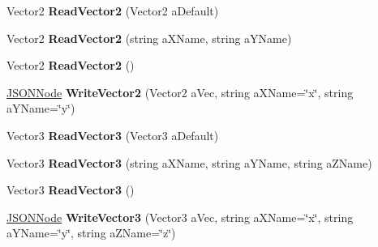 \begin{DoxyCompactItemize}
\item 
Vector2 {\bfseries Read\+Vector2} (Vector2 a\+Default)\hypertarget{classSimpleJSON_1_1JSONNode_aa04ef8dc9b65ed81326158e0f283bbd9}{}\label{classSimpleJSON_1_1JSONNode_aa04ef8dc9b65ed81326158e0f283bbd9}

\item 
Vector2 {\bfseries Read\+Vector2} (string a\+X\+Name, string a\+Y\+Name)\hypertarget{classSimpleJSON_1_1JSONNode_adf312ac8eca31e726111c4c4c8d120e0}{}\label{classSimpleJSON_1_1JSONNode_adf312ac8eca31e726111c4c4c8d120e0}

\item 
Vector2 {\bfseries Read\+Vector2} ()\hypertarget{classSimpleJSON_1_1JSONNode_a8f4a63ba7416bb8316e4da7fec586634}{}\label{classSimpleJSON_1_1JSONNode_a8f4a63ba7416bb8316e4da7fec586634}

\item 
\hyperlink{classSimpleJSON_1_1JSONNode}{J\+S\+O\+N\+Node} {\bfseries Write\+Vector2} (Vector2 a\+Vec, string a\+X\+Name=\char`\"{}x\char`\"{}, string a\+Y\+Name=\char`\"{}y\char`\"{})\hypertarget{classSimpleJSON_1_1JSONNode_a78bc8849e2ab34d607bd13cd960f0cd0}{}\label{classSimpleJSON_1_1JSONNode_a78bc8849e2ab34d607bd13cd960f0cd0}

\item 
Vector3 {\bfseries Read\+Vector3} (Vector3 a\+Default)\hypertarget{classSimpleJSON_1_1JSONNode_a6fee508df8f57593e7209ecba9b0e352}{}\label{classSimpleJSON_1_1JSONNode_a6fee508df8f57593e7209ecba9b0e352}

\item 
Vector3 {\bfseries Read\+Vector3} (string a\+X\+Name, string a\+Y\+Name, string a\+Z\+Name)\hypertarget{classSimpleJSON_1_1JSONNode_a2c6675fc3ae93d9e1e914fece30b789a}{}\label{classSimpleJSON_1_1JSONNode_a2c6675fc3ae93d9e1e914fece30b789a}

\item 
Vector3 {\bfseries Read\+Vector3} ()\hypertarget{classSimpleJSON_1_1JSONNode_a1e100e39b1dafb5fbe25e47d4c3a49b1}{}\label{classSimpleJSON_1_1JSONNode_a1e100e39b1dafb5fbe25e47d4c3a49b1}

\item 
\hyperlink{classSimpleJSON_1_1JSONNode}{J\+S\+O\+N\+Node} {\bfseries Write\+Vector3} (Vector3 a\+Vec, string a\+X\+Name=\char`\"{}x\char`\"{}, string a\+Y\+Name=\char`\"{}y\char`\"{}, string a\+Z\+Name=\char`\"{}z\char`\"{})\hypertarget{classSimpleJSON_1_1JSONNode_a43ab7432b4152a68817f070c1d263b61}{}\label{classSimpleJSON_1_1JSONNode_a43ab7432b4152a68817f070c1d263b61}


\end{DoxyCompactItemize}
